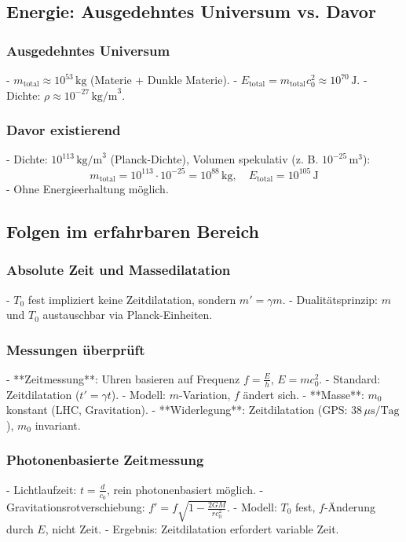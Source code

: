 \documentclass{article}
\begin{document}
	\subsection{Energie: Ausgedehntes Universum vs. Davor}
	
	\subsubsection{Ausgedehntes Universum}
	- \( m_{\text{total}} \approx 10^{53} \, \text{kg} \) (Materie + Dunkle Materie).
	- \( E_{\text{total}} = m_{\text{total}} c_0^2 \approx 10^{70} \, \text{J} \).
	- Dichte: \( \rho \approx 10^{-27} \, \text{kg/m}^3 \).
	
	\subsubsection{Davor existierend}
	- Dichte: \( 10^{113} \, \text{kg/m}^3 \) (Planck-Dichte), Volumen spekulativ (z. B. \( 10^{-25} \, \text{m}^3 \)):
	\[
	m_{\text{total}} = 10^{113} \cdot 10^{-25} = 10^{88} \, \text{kg}, \quad E_{\text{total}} = 10^{105} \, \text{J}
	\]
	- Ohne Energieerhaltung möglich.
	
	\subsection{Folgen im erfahrbaren Bereich}
	
	\subsubsection{Absolute Zeit und Massedilatation}
	- \( T_0 \) fest impliziert keine Zeitdilatation, sondern \( m' = \gamma m \).
	- Dualitätsprinzip: \( m \) und \( T_0 \) austauschbar via Planck-Einheiten.
	
	\subsubsection{Messungen überprüft}
	- **Zeitmessung**: Uhren basieren auf Frequenz \( f = \frac{E}{h} \), \( E = m c_0^2 \).
	- Standard: Zeitdilatation (\( t' = \gamma t \)).
	- Modell: \( m \)-Variation, \( f \) ändert sich.
	- **Masse**: \( m_0 \) konstant (LHC, Gravitation).
	- **Widerlegung**: Zeitdilatation (GPS: \( 38 \, \mu\text{s/Tag} \)), \( m_0 \) invariant.
	
	\subsubsection{Photonenbasierte Zeitmessung}
	- Lichtlaufzeit: \( t = \frac{d}{c_0} \), rein photonenbasiert möglich.
	- Gravitationsrotverschiebung: \( f' = f \sqrt{1 - \frac{2GM}{r c_0^2}} \).
	- Modell: \( T_0 \) fest, \( f \)-Änderung durch \( E \), nicht Zeit.
	- Ergebnis: Zeitdilatation erfordert variable Zeit.
	
\end{document}

